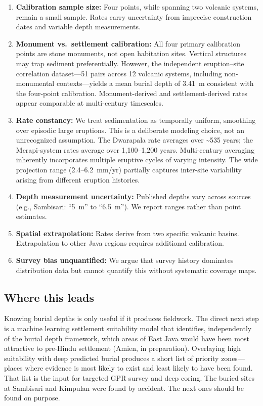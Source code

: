 \documentclass[egqsj, manuscript]{copernicus}
\begin{document}
\begin{enumerate}
  \item \textbf{Calibration sample size:} Four points, while spanning two volcanic systems, remain a small sample. Rates carry uncertainty from imprecise construction dates and variable depth measurements.
  \item \textbf{Monument vs.~settlement calibration:} All four primary calibration points are stone monuments, not open habitation sites. Vertical structures may trap sediment preferentially. However, the independent eruption--site correlation dataset---51 pairs across 12 volcanic systems, including non-monumental contexts---yields a mean burial depth of 3.41~m consistent with the four-point calibration. Monument-derived and settlement-derived rates appear comparable at multi-century timescales.
  \item \textbf{Rate constancy:} We treat sedimentation as temporally uniform, smoothing over episodic large eruptions. This is a deliberate modeling choice, not an unrecognized assumption. The Dwarapala rate averages over \textasciitilde535 years; the Merapi-system rates average over 1,100--1,200 years. Multi-century averaging inherently incorporates multiple eruptive cycles of varying intensity. The wide projection range (2.4--6.2~mm/yr) partially captures inter-site variability arising from different eruption histories.
  \item \textbf{Depth measurement uncertainty:} Published depths vary across sources (e.g., Sambisari: ``5~m'' to ``6.5~m''). We report ranges rather than point estimates.
  \item \textbf{Spatial extrapolation:} Rates derive from two specific volcanic basins. Extrapolation to other Java regions requires additional calibration.
  \item \textbf{Survey bias unquantified:} We argue that survey history dominates distribution data but cannot quantify this without systematic coverage maps.
\end{enumerate}

\subsection{Where this leads}

Knowing burial depths is only useful if it produces fieldwork. The direct next step is a machine learning settlement suitability model that identifies, independently of the burial depth framework, which areas of East Java would have been most attractive to pre-Hindu settlement (Amien, in preparation). Overlaying high suitability with deep predicted burial produces a short list of priority zones---places where evidence is most likely to exist and least likely to have been found. That list is the input for targeted GPR survey and deep coring. The buried sites at Sambisari and Kimpulan were found by accident. The next ones should be found on purpose.
\end{document}
